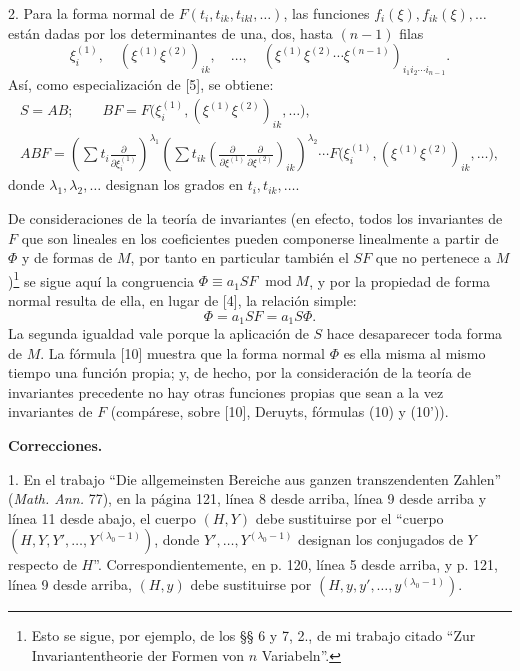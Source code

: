 \documentclass[11pt]{article}
\newcommand{\modu}[1]{\;\operatorname{mod} #1}
\providecommand{\p}{\partial}
\begin{document}
2. Para la forma normal de \(F(t_i,t_{ik},t_{ikl},\ldots)\), las funciones \(f_i(\xi),f_{ik}(\xi),\ldots\) están dadas por los determinantes de una, dos, hasta \((n-1)\) filas
\[
        \xi_i^{(1)},\quad (\xi^{(1)}\xi^{(2)})_{ik},\quad\ldots,\quad
        (\xi^{(1)}\xi^{(2)}\cdots\xi^{(n-1)})_{i_1i_2\cdots i_{n-1}}.
\]
Así, como especialización de [5], se obtiene:
\[
\begin{gathered}
        S=AB;\qquad
        BF=F\bigl(\xi_i^{(1)},(\xi^{(1)}\xi^{(2)})_{ik},\ldots\bigr),\\
        ABF=\left(\sum t_i\frac{\p}{\p\xi_i^{(1)}}\right)^{\lambda_1}
        \left(\sum t_{ik}\left(\frac{\p}{\p\xi^{(1)}}\frac{\p}{\p\xi^{(2)}}\right)_{ik}\right)^{\lambda_2}
        \cdots F\bigl(\xi_i^{(1)},(\xi^{(1)}\xi^{(2)})_{ik},\ldots\bigr),
\end{gathered}
\]
donde \(\lambda_1,\lambda_2,\ldots\) designan los grados en \(t_i,t_{ik},\ldots\).

De consideraciones de la teoría de invariantes (en efecto, todos los invariantes de \(F\) que son lineales en los coeficientes pueden componerse linealmente a partir de \(\Phi\) y de formas de \(M\), por tanto en particular también el \(SF\) que no pertenece a \(M\))\footnote{Esto se sigue, por ejemplo, de los §§ 6 y 7, 2., de mi trabajo citado ``Zur Invariantentheorie der Formen von \(n\) Variabeln''.} se sigue aquí la congruencia \(\Phi\equiv a_1SF\modu{M}\), y por la propiedad de forma normal resulta de ella, en lugar de [4], la relación simple:
\begin{equation}
        \Phi=a_1SF=a_1S\Phi.
\tag{10}
\end{equation}
La segunda igualdad vale porque la aplicación de \(S\) hace desaparecer toda forma de \(M\). La fórmula [10] muestra que la forma normal \(\Phi\) es ella misma al mismo tiempo una función propia; y, de hecho, por la consideración de la teoría de invariantes precedente no hay otras funciones propias que sean a la vez invariantes de \(F\) (compárese, sobre [10], Deruyts, fórmulas (10) y (10')).

\begin{center}
\textbf{Correcciones.}
\end{center}

1. En el trabajo ``Die allgemeinsten Bereiche aus ganzen transzendenten Zahlen'' (\emph{Math. Ann.} 77), en la página 121, línea 8 desde arriba, línea 9 desde arriba y línea 11 desde abajo, el cuerpo \((H,Y)\) debe sustituirse por el ``cuerpo \((H,Y,Y',\ldots,Y^{(\lambda_0-1)})\), donde \(Y',\ldots,Y^{(\lambda_0-1)}\) designan los conjugados de \(Y\) respecto de \(H\)''. Correspondientemente, en p. 120, línea 5 desde arriba, y p. 121, línea 9 desde arriba, \((H,y)\) debe sustituirse por \((H,y,y',\ldots,y^{(\lambda_0-1)})\).
\end{document}
